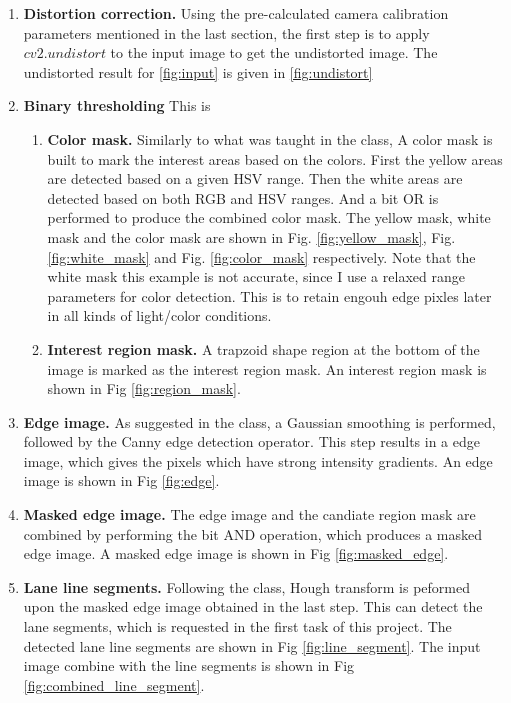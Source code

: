 \documentclass[12pt]{article}
\begin{document}
\begin{enumerate}
	\item \textbf{Distortion correction.} Using the pre-calculated camera calibration parameters mentioned in the last section, the first step is to apply $cv2.undistort$ to the input image to get the undistorted image. The undistorted result for \ref{fig:input} is given in \ref{fig:undistort}

	\item  \textbf{Binary thresholding} This is 

		\begin{enumerate}
			\item \textbf{Color mask.} Similarly to what was taught in the class, A color mask is built to mark the interest areas based on the colors. First the yellow areas are detected based on a given HSV range. Then the white areas are detected based on both RGB and HSV ranges. And a bit OR is performed to produce the combined color mask. The yellow mask, white mask and the color mask are shown in Fig. \ref{fig:yellow_mask}, Fig. \ref{fig:white_mask} and Fig. \ref{fig:color_mask} respectively. Note that the white mask this example is not accurate, since I use a relaxed range parameters for color detection. This is to retain engouh edge pixles later in all kinds of light/color conditions.

			\item  \textbf{Interest region mask.} A trapzoid shape region at the bottom of the image is marked as the interest region mask. An interest region mask is shown in Fig \ref{fig:region_mask}.
		\end{enumerate}

	\item \textbf{Edge image.} As suggested in the class, a Gaussian smoothing is performed, followed by the Canny edge detection operator. This step results in a edge image, which gives the pixels which have strong intensity gradients. An edge image is shown in Fig \ref{fig:edge}.
	
	\item \textbf{Masked edge image.} The edge image and the candiate region mask are combined by performing the bit AND operation, which produces a masked edge image. A masked edge image is shown in Fig \ref{fig:masked_edge}.
	
	\item \textbf{Lane line segments.} Following the class, Hough transform is peformed upon the masked edge image obtained in the last step. This can detect the lane segments, which is requested in the first task of this project. The detected lane line segments are shown in Fig \ref{fig:line_segment}. The input image combine with the line segments is shown in Fig \ref{fig:combined_line_segment}.
	

\end{enumerate}
\end{document}
